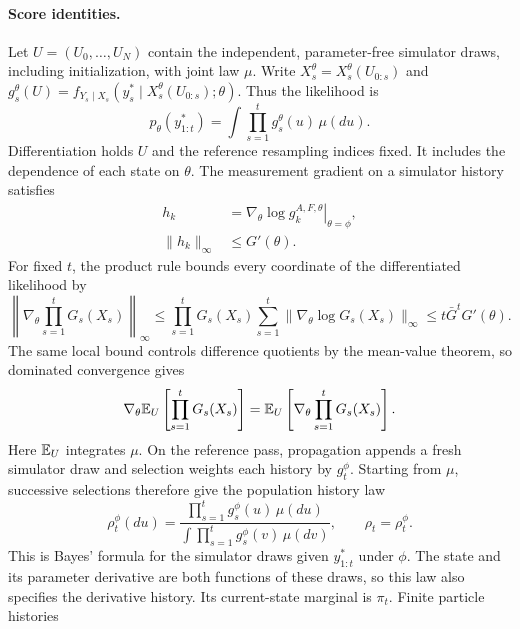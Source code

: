 \documentclass[11pt]{article}
\theoremstyle{thmstylethree}%
\begin{document}
{\paragraph*{Score identities.}
Let $U=(U_0,\ldots,U_N)$ contain the independent, parameter-free
simulator draws, including initialization, with joint law $\mu$.
Write $X_s^\theta=X_s^\theta(U_{0:s})$ and
$g_s^\theta(U)=f_{Y_s\mid X_s}(y_s^*\mid X_s^\theta(U_{0:s});\theta)$.
Thus the likelihood is
\[
p_\theta(y_{1:t}^*)=\int\prod_{s=1}^t g_s^\theta(u)\,\mu(du).
\]
Differentiation holds $U$ and the reference resampling indices fixed.
It includes the dependence of each state on $\theta$. The
measurement gradient on a simulator history satisfies
\begin{align}
h_k&=\left.\nabla_\theta\log g_k^{A,F,\theta}\right|_{\theta=\phi},
\label{eq:actual-path-score}\\
\|h_k\|_\infty&\leq G'(\theta).
\label{eq:bounded-realized-measurement-score}
\end{align}
For fixed $t$, the
product rule bounds every coordinate of the differentiated likelihood by
\begin{equation}
\left\|\nabla_\theta\prod_{s=1}^tG_s(X_s)\right\|_\infty
\leq \prod_{s=1}^tG_s(X_s)\sum_{s=1}^t
\|\nabla_\theta\log G_s(X_s)\|_\infty
\leq t\bar G^tG'(\theta).
\label{eq:finite-horizon-product-derivative-bound}
\end{equation}
The same local bound controls difference quotients by the mean-value
theorem, so dominated convergence gives
\begin{equation}
\nabla_\theta\mathbb{E}_U\left[\prod_{s=1}^tG_s(X_s)\right]
=\mathbb{E}_U\left[\nabla_\theta\prod_{s=1}^tG_s(X_s)\right].
\label{eq:finite-horizon-differentiation-under-expectation}
\end{equation}
Here $\mathbb{E}_U$ integrates $\mu$. On the reference pass, propagation appends
a fresh simulator draw and selection weights each history by $g_t^\phi$.
Starting from $\mu$, successive selections therefore give the population
history law
\begin{equation}
\rho_t^\phi(du)=
\frac{\prod_{s=1}^t g_s^\phi(u)\,\mu(du)}
{\int\prod_{s=1}^t g_s^\phi(v)\,\mu(dv)},
\qquad \rho_t=\rho_t^\phi.
\label{eq:canonical-extended-posterior-path-law}
\end{equation}
This is Bayes' formula for the simulator draws given $y_{1:t}^*$ under
$\phi$. The state and its parameter derivative are both functions of
these draws, so this law also specifies the derivative history.
Its current-state marginal is $\pi_t$. Finite particle histories
}
\end{document}
